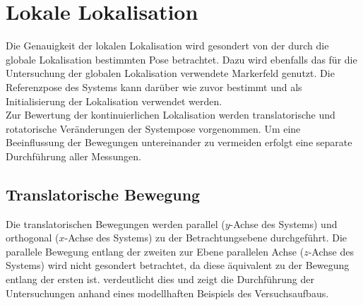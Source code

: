 











\section{Lokale Lokalisation}%
Die Genauigkeit der lokalen Lokalisation wird gesondert von der durch die globale Lokalisation bestimmten Pose betrachtet. Dazu wird ebenfalls das für die Untersuchung der globalen Lokalisation verwendete Markerfeld genutzt. Die Referenzpose des Systems kann darüber wie zuvor bestimmt und als Initialisierung der Lokalisation verwendet werden.\\

Zur Bewertung der kontinuierlichen Lokalisation werden translatorische und rotatorische Veränderungen der Systempose vorgenommen. Um eine Beeinflussung der Bewegungen untereinander zu vermeiden erfolgt eine separate Durchführung aller Messungen.\\

\subsection{Translatorische Bewegung}
Die translatorischen Bewegungen werden parallel ($y$-Achse des Systems) und orthogonal ($x$-Achse des Systems) zu der Betrachtungsebene durchgeführt. Die parallele Bewegung entlang der zweiten zur Ebene parallelen Achse ($z$-Achse des Systems) wird nicht gesondert betrachtet, da diese äquivalent zu der Bewegung entlang der ersten ist.  verdeutlicht dies und zeigt die Durchführung der Untersuchungen anhand eines modellhaften Beispiels des Versuchsaufbaus.\\

